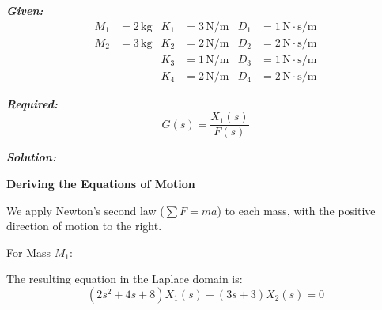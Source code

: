 \documentclass[11pt]{article}
\begin{document}
\vspace{12pt}

\noindent\textbf{\textit{Given:}}
\[
\begin{aligned}
M_1 &= 2\, \text{kg} & K_1 &= 3\, \text{N/m} & D_1 &= 1\, \text{N}\cdot\text{s/m} \\
M_2 &= 3\, \text{kg} & K_2 &= 2\, \text{N/m} & D_2 &= 2\, \text{N}\cdot\text{s/m} \\
& & K_3 &= 1\, \text{N/m} & D_3 &= 1\, \text{N}\cdot\text{s/m} \\
& & K_4 &= 2\, \text{N/m} & D_4 &= 2\, \text{N}\cdot\text{s/m}
\end{aligned}
\]

\vspace{12pt}

\noindent \textbf{\textit{Required:}}
\[
G(s) = \frac{X_1(s)}{F(s)}
\]

\vspace{12pt}

\noindent \textbf{\textit{Solution:}}

\vspace{12pt}

\noindent \textbf{Deriving the Equations of Motion}
\vspace{12pt}

\noindent We apply Newton's second law ($\sum F = ma$) to each mass, with the positive direction of motion to the right. 

\vspace{12pt}
{For Mass $M_1$:}
\begin{figure}[h!]
\centering
{}
\end{figure}

The resulting equation in the Laplace domain is:
\begin{equation}
(2s^2 + 4s + 8)X_1(s) - (3s + 3)X_2(s) = 0 \tag{1}
\end{equation}
\end{document}

